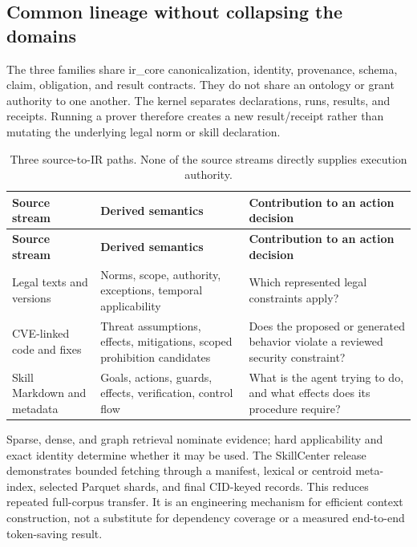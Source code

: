 \documentclass{article}
\begin{document}
\subsection{Common lineage without collapsing the domains}

The three families share ir\_\allowbreak{}core canonicalization, identity, provenance, schema, claim, obligation, and result contracts. They do not share an ontology or grant authority to one another. The kernel separates declarations, runs, results, and receipts. Running a prover therefore creates a new result/receipt rather than mutating the underlying legal norm or skill declaration.
\begingroup
\renewcommand{\thetable}{1}
\begin{longtable}{@{}>{\raggedright\arraybackslash}p{.24\linewidth} >{\raggedright\arraybackslash}p{.32\linewidth} >{\raggedright\arraybackslash}p{.38\linewidth}@{}}
\caption{Three source-to-IR paths. None of the source streams directly supplies execution authority.}\label{tab:1}\\
\toprule
\textbf{Source stream} & \textbf{Derived semantics} & \textbf{Contribution to an action decision} \\
\midrule
\endfirsthead
\textbf{Source stream} & \textbf{Derived semantics} & \textbf{Contribution to an action decision} \\
\midrule
\endhead
\bottomrule
\endlastfoot
Legal texts and versions & Norms, scope, authority, exceptions, temporal applicability & Which represented legal constraints apply? \\[3pt]
CVE-linked code and fixes & Threat assumptions, effects, mitigations, scoped prohibition candidates & Does the proposed or generated behavior violate a reviewed security constraint? \\[3pt]
Skill Markdown and metadata & Goals, actions, guards, effects, verification, control flow & What is the agent trying to do, and what effects does its procedure require? \\[3pt]
\end{longtable}
\endgroup


Sparse, dense, and graph retrieval nominate evidence; hard applicability and exact identity determine whether it may be used. The SkillCenter release demonstrates bounded fetching through a manifest, lexical or centroid meta-index, selected Parquet shards, and final CID-keyed records. This reduces repeated full-corpus transfer. It is an engineering mechanism for efficient context construction, not a substitute for dependency coverage or a measured end-to-end token-saving result.
\end{document}
